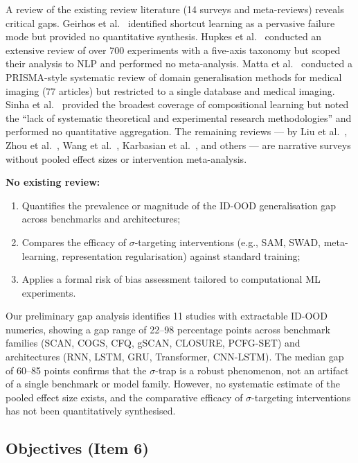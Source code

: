 A review of the existing review literature (14 surveys and meta-reviews) reveals critical gaps. Geirhos et al.~\cite{geirhos2020shortcut} identified shortcut learning as a pervasive failure mode but provided no quantitative synthesis. Hupkes et al.~\cite{hupkes2023taxonomy} conducted an extensive review of over 700 experiments with a five-axis taxonomy but scoped their analysis to NLP and performed no meta-analysis. Matta et al.~\cite{matta2024systematic} conducted a PRISMA-style systematic review of domain generalisation methods for medical imaging (77 articles) but restricted to a single database and medical imaging. Sinha et al.~\cite{sinha2024systematic} provided the broadest coverage of compositional learning but noted the ``lack of systematic theoretical and experimental research methodologies'' and performed no quantitative aggregation. The remaining reviews --- by Liu et al.~\cite{liu2021towards}, Zhou et al.~\cite{zhou2023domain}, Wang et al.~\cite{wang2022generalizing}, Karbasian et al.~\cite{karbasian2025unified}, and others --- are narrative surveys without pooled effect sizes or intervention meta-analysis.

\noindent\textbf{No existing review:}
\begin{enumerate}[nosep]
\item Quantifies the prevalence or magnitude of the ID-OOD generalisation gap across benchmarks and architectures;
\item Compares the efficacy of $\sigma$-targeting interventions (e.g., SAM, SWAD, meta-learning, representation regularisation) against standard training;
\item Applies a formal risk of bias assessment tailored to computational ML experiments.
\end{enumerate}

Our preliminary gap analysis identifies 11 studies with extractable ID-OOD numerics, showing a gap range of 22--98 percentage points across benchmark families (SCAN, COGS, CFQ, gSCAN, CLOSURE, PCFG-SET) and architectures (RNN, LSTM, GRU, Transformer, CNN-LSTM). The median gap of 60--85 points confirms that the $\sigma$-trap is a robust phenomenon, not an artifact of a single benchmark or model family. However, no systematic estimate of the pooled effect size exists, and the comparative efficacy of $\sigma$-targeting interventions has not been quantitatively synthesised.

\subsection{Objectives (Item 6)}

